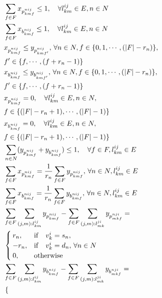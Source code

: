 \documentclass[a4j,twocolumn,fleqn]{jarticle}
\begin{document}
\begin{eqnarray}
	& \displaystyle \sum_{f \in F}x_{p^{nij}_{kmf}} \leq 1,\quad \forall l^{ij}_{km} \in E,n \in N\\%
	& \displaystyle \sum_{f \in F}x_{b^{nij}_{kmf}} \leq 1,\quad \forall l^{ij}_{km} \in E,n \in N\\%
	& \displaystyle x_{p^{nij}_{kmf}} \leq y_{p^{nij}_{kmf'}},\, \forall n \in N,f \in \{0,1, \cdots ,(|F| - r_n)\}, \nonumber \\
	&f' \in \{f, \cdots ,(f + r_n -1)\}\\%
	& \displaystyle x_{b^{nij}_{kmf}} \leq y_{b^{nij}_{kmf'}},\, \forall n \in N,f \in \{0,1, \cdots ,(|F| - r_n)\}, \nonumber \\
	&f' \in \{f, \cdots ,(f + r_n -1)\}\\%
	&\displaystyle x_{p^{nij}_{kmf}}=0,\quad \forall l^{ij}_{km}\in E,n \in N,\nonumber \\
	&f \in \{(|F|-r_n +1),\cdots,(|F|-1)\}\\%
	&\displaystyle x_{b^{nij}_{kmf}}=0,\quad\forall l^{ij}_{km}\in E,n \in N,\nonumber \\
	&f \in \{(|F|-r_n +1),\cdots,(|F|-1)\}\\%
	&\displaystyle \sum_{n \in N}(y_{p^{nij}_{kmf}} + y_{b^{nij}_{kmf}}) \leq 1,\quad \forall f \in F, l^{ij}_{km}\in E\\%
	&\displaystyle \sum_{f \in F}x_{p^{nij}_{kmf}} = \frac{1}{r_n} \sum_{f \in F}y_{p^{nij}_{kmf}},\, \forall n \in N, l^{ij}_{km} \in E\\%
	&\displaystyle \sum_{f \in F}x_{b^{nij}_{kmf}} = \frac{1}{r_n} \sum_{f \in F}y_{b^{nij}_{kmf}},\, \forall n \in N, l^{ij}_{km} \in E\\%
	&\displaystyle \sum_{f \in F}\sum_{(j,m):l^{ij}_{km}}y_{p^{nij}_{kmf}} - \sum_{f \in F}\sum_{(j,m):l^{ji}_{mk}}y_{p^{nji}_{mkf}} = \nonumber \\
	&\begin{cases}
	r_n,&{\rm if}\quad v^i_k = s_n,\\
	-r_n,&{\rm if}\quad v^i_k = d_n,\, \forall n\in N\\ %
	0,&{\rm otherwise}\\
	\end{cases}\\
	&\displaystyle \sum_{f \in F}\sum_{(j,m):l^{ij}_{km}}y_{b^{nij}_{kmf}} - \sum_{f \in F}\sum_{(j,m):l^{ji}_{mk}}y_{b^{nji}_{mkf}} = \nonumber \\
	&\begin{cases}

\end{cases}
\end{eqnarray}
\end{document}
